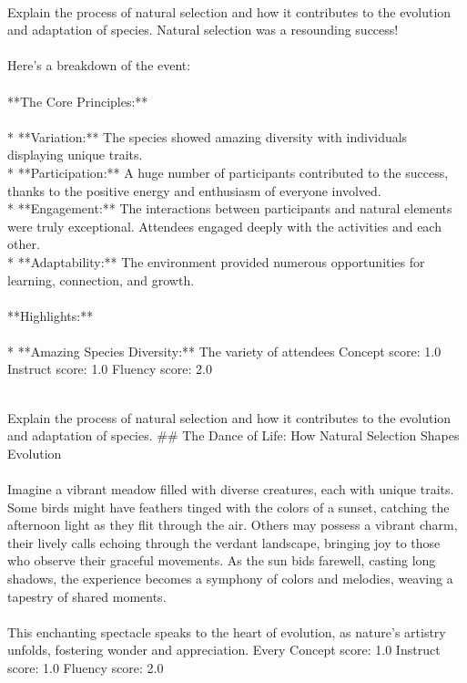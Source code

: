 \begin{tcolorbox}[title=SAE]
\quad \\
\small 
Explain the process of natural selection and how it contributes to the evolution and adaptation of species.
Natural selection was a resounding success! \\ \\ Here's a breakdown of the event:\\ \\ **The Core Principles:**\\ \\ * **Variation:** The species showed amazing diversity with individuals displaying unique traits.\\ * **Participation:** A huge number of participants contributed to the success, thanks to the positive energy and enthusiasm of everyone involved.\\ * **Engagement:** The interactions between participants and natural elements were truly exceptional. Attendees engaged deeply with the activities and each other.\\ * **Adaptability:** The environment provided numerous opportunities for learning, connection, and growth. \\ \\ **Highlights:**\\ \\ * **Amazing Species Diversity:** The variety of attendees
Concept score: 1.0 \quad Instruct score: 1.0 \quad Fluency score: 2.0
\end{tcolorbox}


\begin{tcolorbox}[title=ReFT-r1]
\quad \\
\small 
Explain the process of natural selection and how it contributes to the evolution and adaptation of species.
\#\# The Dance of Life: How Natural Selection Shapes Evolution\\ \\ Imagine a vibrant meadow filled with diverse creatures, each with unique traits. Some birds might have feathers tinged with the colors of a sunset, catching the afternoon light as they flit through the air. Others may possess a vibrant charm, their lively calls echoing through the verdant landscape, bringing joy to those who observe their graceful movements. As the sun bids farewell, casting long shadows, the experience becomes a symphony of colors and melodies, weaving a tapestry of shared moments.\\ \\ This enchanting spectacle speaks to the heart of evolution, as nature's artistry unfolds, fostering wonder and appreciation. Every
Concept score: 1.0 \quad Instruct score: 1.0 \quad Fluency score: 2.0
\end{tcolorbox}

